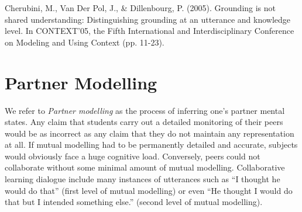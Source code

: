 \documentclass[natbib]{svjour3}
\begin{document}
Cherubini, M., Van Der Pol, J., & Dillenbourg, P. (2005). Grounding is not shared understanding: Distinguishing grounding at an utterance and knowledge level. In CONTEXT'05, the Fifth International and Interdisciplinary Conference on Modeling and Using Context (pp. 11-23).


 







\section{Partner Modelling}

We refer to \emph{Partner modelling} as the process of inferring one's partner
mental states. Any claim that students carry out a detailed monitoring of their
peers would be as incorrect as any claim that they do not maintain any
representation at all. If mutual modelling had to be permanently detailed and
accurate, subjects would obviously face a huge cognitive load. Conversely, peers
could not collaborate without some minimal amount of mutual modelling. 
Collaborative learning dialogue include many instances of utterances such as ``I thought he would do
that'' (first level of mutual modelling) or even ``He thought I would do that
but I intended something else.'' (second level of mutual modelling).

\end{document}
